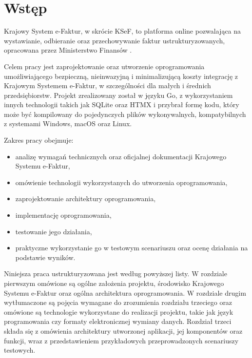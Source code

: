 \chapter*{Wstęp}

Krajowy System e-Faktur, w skrócie KSeF, to platforma online pozwalająca na wystawianie, odbieranie oraz przechowywanie faktur ustrukturyzowanych, opracowana przez Ministerstwo Finansów \parencite{ministerstwo_finansow_pytania_2025}. 

Celem pracy jest zaprojektowanie oraz utworzenie oprogramowania umożliwiającego bezpieczną, nieinwazyjną i minimalizującą koszty integrację z Krajowym Systemem e-Faktur, w szczególności dla małych i średnich przedsiębiorstw. Projekt zrealizowany został w języku Go, z wykorzystaniem innych technologii takich jak SQLite oraz HTMX i przybrał formę kodu, który może być kompilowany do pojedynczych plików wykonywalnych, kompatybilnych z systemami Windows, macOS oraz Linux. 
\par
Zakres pracy obejmuje:
\begin{itemize}
    \item analizę wymagań technicznych oraz oficjalnej dokumentacji Krajowego Systemu e-Faktur,
    \item omówienie technologii wykorzystanych do utworzenia oprogramowania,
    \item zaprojektowanie architektury oprogramowania,
    \item implementację oprogramowania,
    \item testowanie jego działania,
    \item praktyczne wykorzystanie go w testowym scenariuszu oraz ocenę działania na podstawie wyników.
\end{itemize}

Niniejsza praca ustrukturyzowana jest według powyższej listy. W rozdziale pierwszym omówione są ogólne założenia projektu, środowisko Krajowego Systemu e-Faktur oraz ogólna architektura oprogramowania. W rozdziale drugim wytłumaczone są pojęcia wymagane do zrozumienia rozdziału trzeciego oraz omówione są technologie wykorzystane do realizacji projektu, takie jak język programowania czy formaty elektronicznej wymiany danych. Rozdział trzeci składa się z omówienia architektury utworzonej aplikacji, jej komponentów oraz funkcji, wraz z przedstawieniem przykładowych przeprowadzonych scenariuszy testowych.
